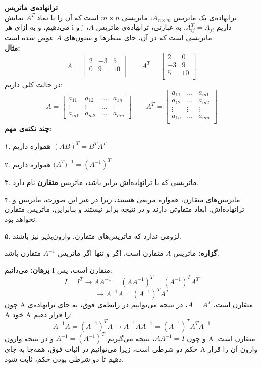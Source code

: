 \textbf{ترانهاده‌ی ماتریس}\\
ترانهاده‌ی یک ماتریس $A_{n \times m}$، ماتریسی $m\times n$ است که آن را با نماد $A^T$ نمایش می‌دهیم، و به ازای هر i و j داریم $A_{ij}^T = A_{ji}$. به عبارتی، ترانهاده‌ی ماتریس $A$، ماتریسی است که در آن، جای سطر‌ها و ستون‌های $A$ عوض شده است.\\
\textbf{مثال:}
\[A = \begin{bmatrix}
2&-3&5\\
0&9&10\\
\end{bmatrix}\qquad
A^{T} = \begin{bmatrix}
2&0\\
-3&9\\
5&10\\
\end{bmatrix}\]
در حالت کلی داریم:\\
\[ A= \begin{bmatrix}
a_{11} &a_{12}& \ldots & a_{1n}\\
\vdots  &\vdots& \ldots &\vdots\\
a_{m1} &a_{m2}& \ldots & a_{mn}
\end{bmatrix}
\qquad
A^{T}=\begin{bmatrix}
a_{11}&\ldots & a_{m1}\\
a_{12}&\ldots & a_{m2}\\
\vdots&\vdots & \vdots\\
a_{1n}&\ldots &  a_{mn}\\
\end{bmatrix}\]
\textbf{چند نکته‌ی مهم:}

۱. همواره داریم $(AB)^T=B^TA^T$

۲. همواره داریم ${{(A}}^T)^{-1}=(A^{-1})^T$

۳. ماتریسی که با ترانهاده‌اش برابر باشد، ماتریس \textbf{متقارن} نام دارد.

۴. ماتریس‌های متقارن، همواره مربعی هستند، زیرا در غیر این صورت، ماتریس و ترانهاده‌اش، ابعاد متفاوتی دارند و در نتیجه برابر نیستند و بنابراین، ماتریس متقارن نخواهد بود.

۵. لزومی ندارد که ماتریس‌های متقارن، وارون‌پذیر نیز باشند.

\textbf{گزاره:} ماتریس $A$ متقارن است، اگر و تنها اگر ماتریس $A^{-1}$ متقارن باشد.

\textbf{برهان:} می‌دانیم I متقارن است، پس:
$$I = I^T \to AA^{-1} = {(AA^{-1})}^T = {(A^{-1})}^T A^T$$
$$\to A^{-1}A = {(A^{-1})}^T A^T$$
چون A متقارن است، $A = A^T$، در نتیجه می‌توانیم در رابطه‌ی فوق، به جای ترانهاده‌ی A خود A را قرار دهیم:
$$A^{-1}A = {(A^{-1})}^T A \to A^{-1}AA^{-1} = {(A^{-1})}^T A^T A^{-1}$$
و چون $A A^{-1} = I$، نتیجه‌ می‌گیریم $A^{-1} = {(A^{-1})}^T$ و در نتیجه وارون A متقارن است. حکم دو شرطی است، زیرا می‌توانیم در اثبات فوق، همه‌جا به جای A وارون آن را قرار دهیم تا دو شرطی بودن حکم، ثابت شود.

